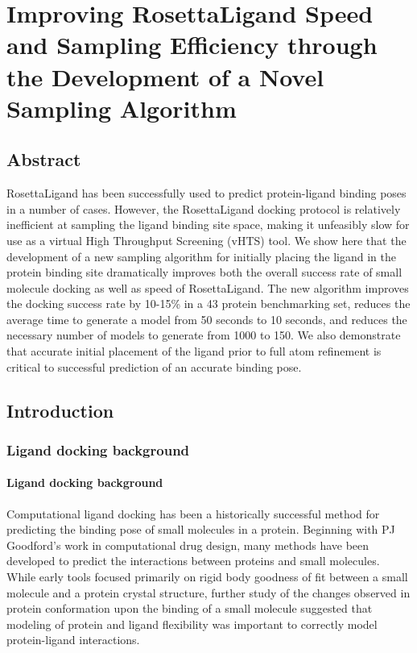 \chapter{Improving RosettaLigand Speed and Sampling Efficiency through the Development of a Novel Sampling Algorithm}
\label{chap:lowres_paper}
\section{Abstract}

RosettaLigand has been successfully used to predict protein-ligand binding poses in a number of cases\citep{Turlington:2013et,Davis:2009fx,Combs:2013bl}.
However, the RosettaLigand docking protocol is relatively inefficient at sampling the ligand binding site space, making it unfeasibly slow for use as a virtual High Throughput Screening (vHTS) tool.
We show here that the development of a new sampling algorithm for initially placing the ligand in the protein binding site dramatically improves both the overall success rate of small molecule docking as well as speed of RosettaLigand.
The new algorithm improves the docking success rate by 10-15\% in a 43 protein benchmarking set, reduces the average time to generate a model from 50 seconds to 10 seconds, and reduces the necessary number of models to generate from 1000 to 150.
We also demonstrate that accurate initial placement of the ligand prior to full atom refinement is critical to successful prediction of an accurate binding pose.

\section{Introduction}

\subsection{Ligand docking background}

\subsubsection{Ligand docking background}

Computational ligand docking has been a historically successful method for predicting the binding pose of small molecules in a protein.
Beginning with PJ Goodford's work in computational drug design\citep{Goodford:1985bf}, many methods have been developed to predict the interactions between proteins and small molecules.
While early tools focused primarily on rigid body goodness of fit between a small molecule and a protein crystal structure, further study of the changes observed in protein conformation upon the binding of a small molecule\citep{Bystroff:1991tl} suggested that modeling of protein and ligand flexibility was important to correctly model protein-ligand interactions.

